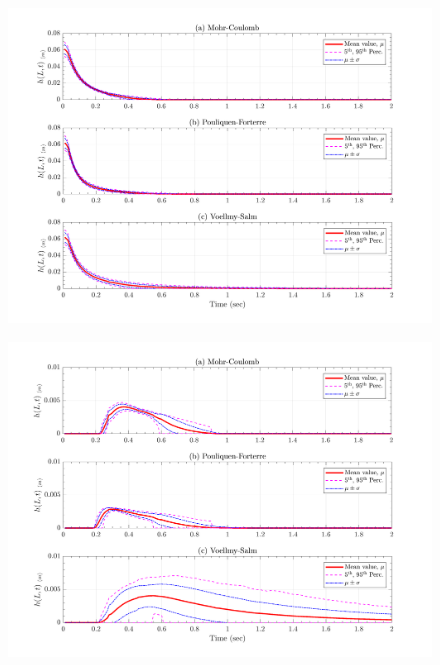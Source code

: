 \documentclass{article}
\begin{document}
\begin{figure}[H]
	\begin{minipage}[b]{0.5\linewidth}
    	\centering
    	\includegraphics[width=1\textwidth]{InclinedPlane/LocalRecords/Records/H_L1.png}
    	\label{fig:Ramp-L1-H}
	\end{minipage}
	\begin{minipage}[b]{0.5\linewidth}
		\centering
		\includegraphics[width=1\textwidth]{InclinedPlane/LocalRecords/Records/H_L2.png}
    	\label{fig:Ramp-L2-H}
    \end{minipage}


\end{figure}
\end{document}
